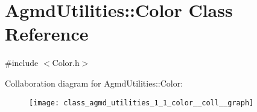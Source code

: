 \hypertarget{class_agmd_utilities_1_1_color}{\section{Agmd\+Utilities\+:\+:Color Class Reference}
\label{class_agmd_utilities_1_1_color}
}


{\ttfamily \#include $<$Color.\+h$>$}



Collaboration diagram for Agmd\+Utilities\+:\+:Color\+:\nopagebreak
\begin{figure}[H]
\begin{center}
\leavevmode
\texttt{[image: class\_agmd\_utilities\_1\_1\_color\_\_coll\_\_graph]}
\end{center}
\end{figure}
